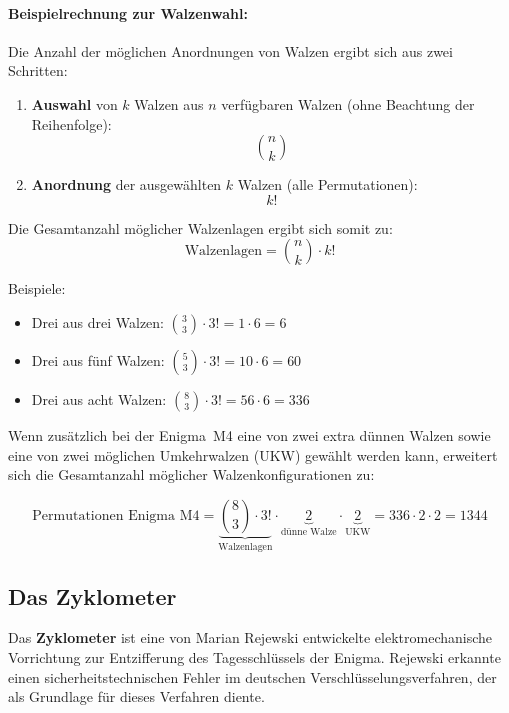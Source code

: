 \documentclass[12pt, ngerman, a4paper, numbers=noenddot]{article}
\begin{document}
\paragraph{Beispielrechnung zur Walzenwahl:}

Die Anzahl der möglichen Anordnungen von Walzen ergibt sich aus zwei Schritten:

\begin{enumerate}
	\item \textbf{Auswahl} von $k$ Walzen aus $n$ verfügbaren Walzen (ohne Beachtung der Reihenfolge):  
	\[
	\binom{n}{k}
	\]
	
	\item \textbf{Anordnung} der ausgewählten $k$ Walzen (alle Permutationen):  
	\[
	k!
	\]
\end{enumerate}

Die Gesamtanzahl möglicher Walzenlagen ergibt sich somit zu:
\[
\text{Walzenlagen} = \binom{n}{k} \cdot k!
\]

\newpage
Beispiele:

\begin{itemize}
	\item Drei aus drei Walzen: \(\binom{3}{3} \cdot 3! = 1 \cdot 6 = 6\)
	\item Drei aus fünf Walzen: \(\binom{5}{3} \cdot 3! = 10 \cdot 6 = 60\)
	\item Drei aus acht Walzen: \(\binom{8}{3} \cdot 3! = 56 \cdot 6 = 336\)
\end{itemize}

Wenn zusätzlich bei der Enigma~M4 eine von zwei extra dünnen Walzen sowie eine von zwei möglichen Umkehrwalzen (UKW) gewählt werden kann, erweitert sich die Gesamtanzahl möglicher Walzenkonfigurationen zu:

\[
\text{Permutationen Enigma~M4} = \underbrace{\binom{8}{3} \cdot 3!}_{\text{Walzenlagen}} \cdot \underbrace{2}_{\text{dünne Walze}} \cdot \underbrace{2}_{\text{UKW}} = 336 \cdot 2 \cdot 2 = 1344
\]




\subsection{Das Zyklometer}

Das \textbf{Zyklometer} ist eine von Marian Rejewski entwickelte elektromechanische Vorrichtung zur Entzifferung des Tagesschlüssels der Enigma. Rejewski erkannte einen sicherheitstechnischen Fehler im deutschen Verschlüsselungsverfahren, der als Grundlage für dieses Verfahren diente.
\end{document}
